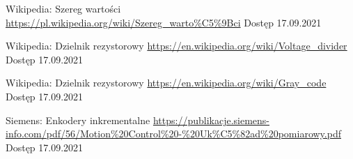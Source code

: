 \begin{thebibliography}{9}
        Wikipedia: Szereg wartości  \newline
        \url{https://pl.wikipedia.org/wiki/Szereg_warto\%C5\%9Bci} \newline
        Dostęp 17.09.2021
    
        Wikipedia: Dzielnik rezystorowy  \newline
        \url{https://en.wikipedia.org/wiki/Voltage\_divider} \newline
        Dostęp 17.09.2021
        
        Wikipedia: Dzielnik rezystorowy  \newline
        \url{https://en.wikipedia.org/wiki/Gray_code} \newline
        Dostęp 17.09.2021
        
        Siemens: Enkodery inkrementalne  \newline
        \url{https://publikacje.siemens-info.com/pdf/56/Motion\%20Control\%20-\%20Uk\%C5\%82ad\%20pomiarowy.pdf} \newline
        Dostęp 17.09.2021

  \end{thebibliography}